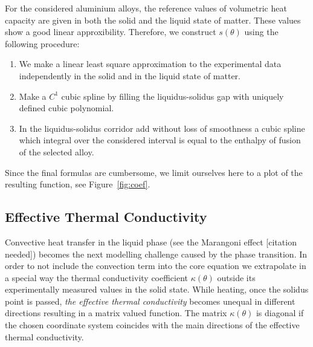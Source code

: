 For the considered aluminium alloys, the reference values of volumetric heat capacity are given in both the solid and the liquid state of matter. These values show a good linear approxibility. Therefore, we construct $s(\theta)$ using the following procedure:
\begin{enumerate}
	\item We make a linear least square approximation to the experimental data independently in the solid and in the liquid state of matter.
	\item Make a $C^1$ cubic spline by filling the liquidus-solidus gap with uniquely defined cubic polynomial.
	\item In the liquidus-solidus corridor add without loss of smoothness a cubic spline which integral over the considered interval is equal to the enthalpy of fusion of the selected alloy.
\end{enumerate}

Since the final formulas are cumbersome, we limit ourselves here to a plot of the resulting function, see Figure~\ref{fig:coef}.


\subsection{Effective Thermal Conductivity}
\label{subsec:conductivity}

Convective heat transfer in the liquid phase (see the Marangoni effect [citation needed]) becomes the next modelling challenge caused by the phase transition. In order to not include the convection term into the core equation we extrapolate in a special way the thermal conductivity coefficient $\kappa(\theta)$ outside its experimentally measured values in the solid state. While heating, once the solidus point is passed, \emph{the effective thermal conductivity} becomes unequal in different directions resulting in a matrix valued function. The matrix $\kappa(\theta)$ is diagonal if the chosen coordinate system coincides with the main directions of the effective thermal conductivity.

